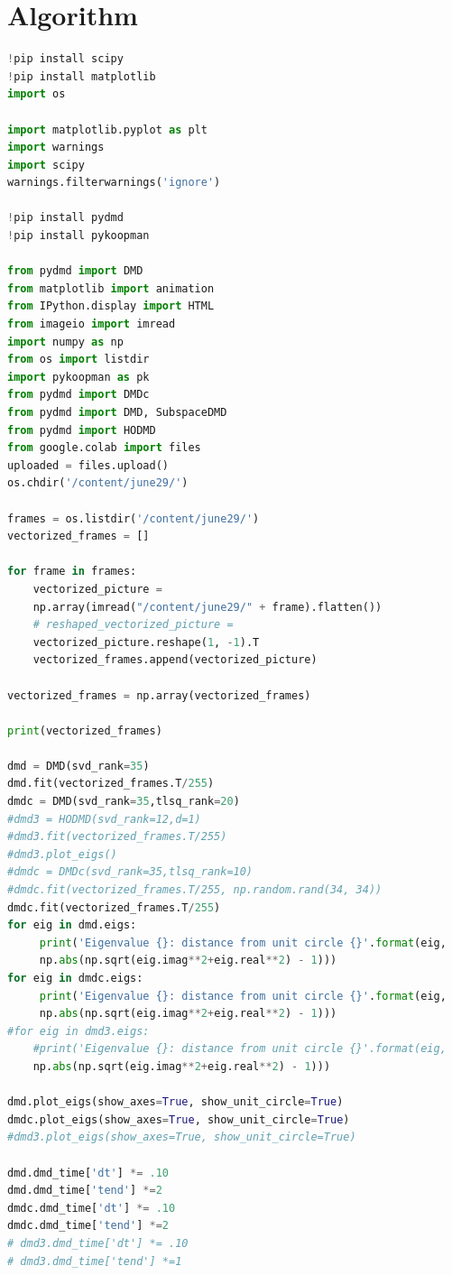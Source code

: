 \documentclass[12pt]{report}
\begin{document}
\chapter{Algorithm} 
\begin{lstlisting}[language=python]
!pip install scipy
!pip install matplotlib
import os

import matplotlib.pyplot as plt
import warnings
import scipy
warnings.filterwarnings('ignore')

!pip install pydmd
!pip install pykoopman

from pydmd import DMD
from matplotlib import animation
from IPython.display import HTML
from imageio import imread
import numpy as np
from os import listdir
import pykoopman as pk
from pydmd import DMDc
from pydmd import DMD, SubspaceDMD
from pydmd import HODMD
from google.colab import files
uploaded = files.upload()
os.chdir('/content/june29/')

frames = os.listdir('/content/june29/')
vectorized_frames = []

for frame in frames:
    vectorized_picture = 
    np.array(imread("/content/june29/" + frame).flatten())
    # reshaped_vectorized_picture = 
    vectorized_picture.reshape(1, -1).T
    vectorized_frames.append(vectorized_picture)

vectorized_frames = np.array(vectorized_frames)

print(vectorized_frames)

dmd = DMD(svd_rank=35)
dmd.fit(vectorized_frames.T/255)
dmdc = DMD(svd_rank=35,tlsq_rank=20)
#dmd3 = HODMD(svd_rank=12,d=1)
#dmd3.fit(vectorized_frames.T/255)
#dmd3.plot_eigs()
#dmdc = DMDc(svd_rank=35,tlsq_rank=10)
#dmdc.fit(vectorized_frames.T/255, np.random.rand(34, 34))
dmdc.fit(vectorized_frames.T/255)
for eig in dmd.eigs:
     print('Eigenvalue {}: distance from unit circle {}'.format(eig,
     np.abs(np.sqrt(eig.imag**2+eig.real**2) - 1)))
for eig in dmdc.eigs:
     print('Eigenvalue {}: distance from unit circle {}'.format(eig,
     np.abs(np.sqrt(eig.imag**2+eig.real**2) - 1))) 
#for eig in dmd3.eigs:
    #print('Eigenvalue {}: distance from unit circle {}'.format(eig,
    np.abs(np.sqrt(eig.imag**2+eig.real**2) - 1)))        

dmd.plot_eigs(show_axes=True, show_unit_circle=True)
dmdc.plot_eigs(show_axes=True, show_unit_circle=True)
#dmd3.plot_eigs(show_axes=True, show_unit_circle=True)

dmd.dmd_time['dt'] *= .10
dmd.dmd_time['tend'] *=2
dmdc.dmd_time['dt'] *= .10
dmdc.dmd_time['tend'] *=2
# dmd3.dmd_time['dt'] *= .10
# dmd3.dmd_time['tend'] *=1


\end{lstlisting}
\end{document}

